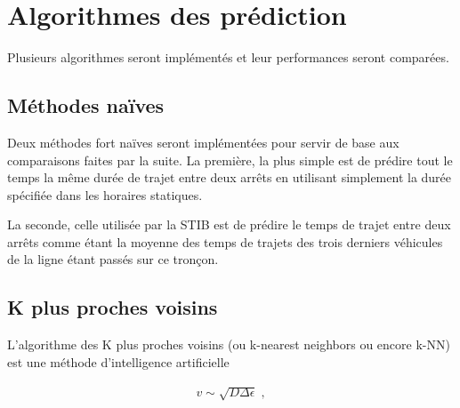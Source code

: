 \documentclass[letterpaper]{article}
\begin{document}
\section{Algorithmes des prédiction}
Plusieurs algorithmes seront implémentés et leur performances seront comparées.

\subsection{Méthodes naïves}
Deux méthodes fort naïves seront implémentées pour servir de base aux comparaisons faites par la suite.
La première, la plus simple est de prédire tout le temps la même durée de trajet entre deux arrêts en utilisant simplement la durée spécifiée dans les horaires statiques.

La seconde, celle utilisée par la STIB est de prédire le temps de trajet entre deux arrêts comme étant la moyenne des temps de trajets des trois derniers véhicules de la ligne étant passés sur ce tronçon.

\subsection{K plus proches voisins}

L'algorithme des K plus proches voisins (ou k-nearest neighbors ou encore k-NN) est une méthode d'intelligence artificielle \citep{trevor2009elements}


\begin{eqnarray}
v\sim\sqrt{D\Delta\epsilon}\;, \label{eq4}
\end{eqnarray}


\footnotesize


\end{document}
